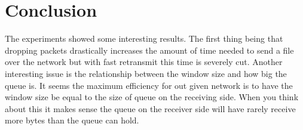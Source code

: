 \documentclass{article}
\begin{document}
\section{Conclusion}

The experiments showed some interesting results.
The first thing being that dropping packets drastically increases the amount of time needed to send a file over the network but with fast retransmit this time is severely cut.
Another interesting issue is the relationship between the window size and how big the queue is.
It seems the maximum efficiency for out given network is to have the window size be equal to the size of queue on the receiving side.
When you think about this it makes sense the queue on the receiver side will have rarely receive more bytes than the queue can hold. 
\end{document}
